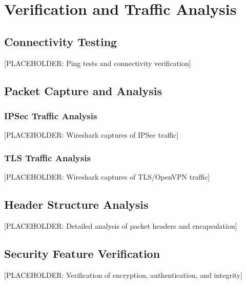 \newpage

\section{Verification and Traffic Analysis}


\subsection{Connectivity Testing}
[PLACEHOLDER: Ping tests and connectivity verification]

\subsection{Packet Capture and Analysis}

\subsubsection{IPSec Traffic Analysis}
[PLACEHOLDER: Wireshark captures of IPSec traffic]

\subsubsection{TLS Traffic Analysis}
[PLACEHOLDER: Wireshark captures of TLS/OpenVPN traffic]

\subsection{Header Structure Analysis}
[PLACEHOLDER: Detailed analysis of packet headers and encapsulation]

\subsection{Security Feature Verification}
[PLACEHOLDER: Verification of encryption, authentication, and integrity]

